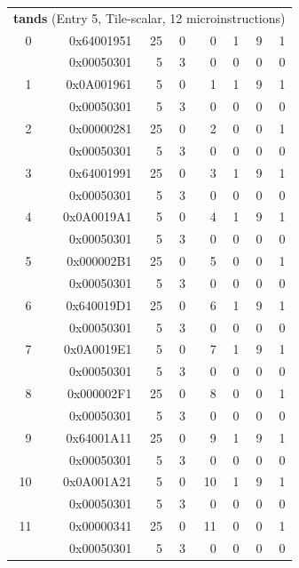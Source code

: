 \begin{longtable}{r r r r r r r r}
\multicolumn{8}{l}{\textbf{tands} (Entry 5, Tile-scalar, 12 microinstructions)} \\
0 & 0x64001951 & 25 & 0 & 0 & 1 & 9 & 1 \\
  & 0x00050301 & 5 & 3 & 0 & 0 & 0 & 0 \\
1 & 0x0A001961 & 5 & 0 & 1 & 1 & 9 & 1 \\
  & 0x00050301 & 5 & 3 & 0 & 0 & 0 & 0 \\
2 & 0x00000281 & 25 & 0 & 2 & 0 & 0 & 1 \\
  & 0x00050301 & 5 & 3 & 0 & 0 & 0 & 0 \\
3 & 0x64001991 & 25 & 0 & 3 & 1 & 9 & 1 \\
  & 0x00050301 & 5 & 3 & 0 & 0 & 0 & 0 \\
4 & 0x0A0019A1 & 5 & 0 & 4 & 1 & 9 & 1 \\
  & 0x00050301 & 5 & 3 & 0 & 0 & 0 & 0 \\
5 & 0x000002B1 & 25 & 0 & 5 & 0 & 0 & 1 \\
  & 0x00050301 & 5 & 3 & 0 & 0 & 0 & 0 \\
6 & 0x640019D1 & 25 & 0 & 6 & 1 & 9 & 1 \\
  & 0x00050301 & 5 & 3 & 0 & 0 & 0 & 0 \\
7 & 0x0A0019E1 & 5 & 0 & 7 & 1 & 9 & 1 \\
  & 0x00050301 & 5 & 3 & 0 & 0 & 0 & 0 \\
8 & 0x000002F1 & 25 & 0 & 8 & 0 & 0 & 1 \\
  & 0x00050301 & 5 & 3 & 0 & 0 & 0 & 0 \\
9 & 0x64001A11 & 25 & 0 & 9 & 1 & 9 & 1 \\
  & 0x00050301 & 5 & 3 & 0 & 0 & 0 & 0 \\
10 & 0x0A001A21 & 5 & 0 & 10 & 1 & 9 & 1 \\
  & 0x00050301 & 5 & 3 & 0 & 0 & 0 & 0 \\
11 & 0x00000341 & 25 & 0 & 11 & 0 & 0 & 1 \\
  & 0x00050301 & 5 & 3 & 0 & 0 & 0 & 0 \\


\end{longtable}
